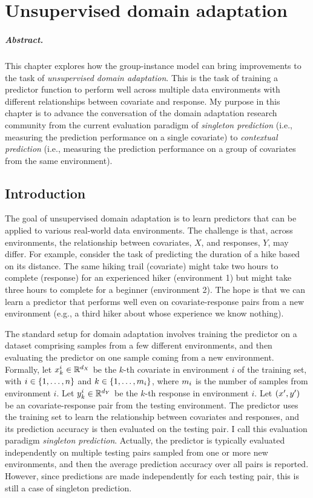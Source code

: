 \documentclass[../thesis.tex]{subfiles}
\begin{document}
\chapter{Unsupervised domain adaptation}

\paragraph{Abstract.} This chapter explores how the group-instance model can bring improvements to the task of \textit{unsupervised domain adaptation}. This is the task of training a predictor function to perform well across multiple data environments with different relationships between covariate and response. My purpose in this chapter is to advance the conversation of the domain adaptation research community from the current evaluation paradigm of \textit{singleton prediction} (i.e., measuring the prediction performance on a single covariate) to \textit{contextual prediction} (i.e., measuring the prediction performance on a group of covariates from the same environment).

\section{Introduction}

The goal of unsupervised domain adaptation is to learn predictors that can be applied to various real-world data environments. The challenge is that, across environments, the relationship between covariates, $X$, and responses, $Y$, may differ. For example, consider the task of predicting the duration of a hike based on its distance. The same hiking trail (covariate) might take two hours to complete (response) for an experienced hiker (environment 1) but might take three hours to complete for a beginner (environment 2). The hope is that we can learn a predictor that performs well even on covariate-response pairs from a new environment (e.g., a third hiker about whose experience we know nothing).

The standard setup for domain adaptation involves training the predictor on a dataset comprising samples from a few different environments, and then evaluating the predictor on one sample coming from a new environment. Formally, let $\myvect{x}^i_{k} \in \mathbb{R}^{\mydim{x}}$ be the $k$-th covariate in environment $i$ of the training set, with $i \in \{1,\dots,n\}$ and $k \in \{1,\dots,m_i\}$, where $m_i$ is the number of samples from environment $i$. Let $\myvect{y}^i_{k} \in \mathbb{R}^{\mydim{y}}$ be the $k$-th response in environment $i$. Let $\left(x', y' \right)$ be an covariate-response pair from the testing environment. The predictor uses the training set to learn the relationship between covariates and responses, and its prediction accuracy is then evaluated on the testing pair. I call this evaluation paradigm \textit{singleton prediction}. Actually, the predictor is typically evaluated independently on multiple testing pairs sampled from one or more new environments, and then the average prediction accuracy over all pairs is reported. However, since predictions are made independently for each testing pair, this is still a case of singleton prediction.
\end{document}
